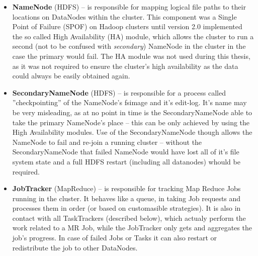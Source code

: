 \begin{itemize}
  \item \textbf{NameNode} (HDFS) -- is responsible for mapping logical file paths to their locations on DataNodes within 
                                    the cluster. This component was a Single Point of Failure (SPOF) on Hadoop clusters 
                                    until version 2.0 implemented the so called High Availability (HA) module, which 
                                    allows the cluster to run a second (not to be confused with \textit{secondary}) 
                                    NameNode in the cluster in the case the primary would fail. The HA module was not 
                                    used during this thesis, as it was not required to ensure the cluster's high 
                                    availability as the data could always be easily obtained again.
  \item \textbf{SecondaryNameNode} (HDFS) -- is responsible for a process called ''checkpointing'' of the NameNode's 
                                            fsimage and it's edit-log. It's name may be very misleading, as at no point
                                            in time is the SecondaryNameNode able to take the primary NameNode's place -- 
                                            this can be only achieved by using the High Availability modules. Use of the 
                                            SecondaryNameNode though allows the NameNode to fail and re-join a running 
                                            cluster -- without the SecondaryNameNode that failed NameNode would have lost 
                                            all of it's file system state and a full HDFS restart (including all 
                                            datanodes) whould be required.
  \item \textbf{JobTracker} (MapReduce) -- is responsible for tracking Map Reduce Jobs running in the cluster. It behaves 
                                           like a queue, in taking Job requests and processes them in order (or based on 
                                           customasible strategies). It is also in contact with all TaskTrackers 
                                           (described below), which actualy perform the work related to a MR Job, while 
                                           the JobTracker only gets and aggregates the job's progress. In case of failed 
                                           Jobs or Tasks it can also restart or redistribute the job to other DataNodes.
\end{itemize}

